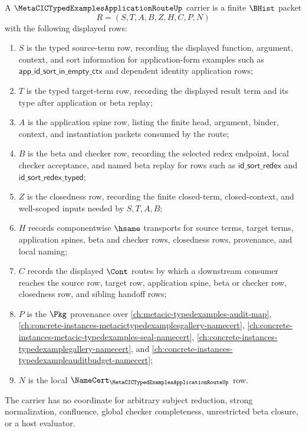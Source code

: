 \begin{definition}
\label{def:metacic-typedexamples-application-route-carrier}
A $\MetaCICTypedExamplesApplicationRouteUp$ carrier is a finite $\BHist$ packet
$$
R=(S,T,A,B,Z,H,C,P,N)
$$
with the following displayed rows:
\begin{enumerate}
\item $S$ is the typed source-term row, recording the displayed function, argument, context, and sort information for application-form examples such as $\mathsf{app\_id\_sort\_in\_empty\_ctx}$ and dependent identity application rows;
\item $T$ is the typed target-term row, recording the displayed result term and its type after application or beta replay;
\item $A$ is the application spine row, listing the finite head, argument, binder, context, and instantiation packets consumed by the route;
\item $B$ is the beta and checker row, recording the selected redex endpoint, local checker acceptance, and named beta replay for rows such as $\mathsf{id\_sort\_redex}$ and $\mathsf{id\_sort\_redex\_typed}$;
\item $Z$ is the closedness row, recording the finite closed-term, closed-context, and well-scoped inputs needed by $S,T,A,B$;
\item $H$ records componentwise $\hsame$ transports for source terms, target terms, application spines, beta and checker rows, closedness rows, provenance, and local naming;
\item $C$ records the displayed $\Cont$ routes by which a downstream consumer reaches the source row, target row, application spine, beta or checker row, closedness row, and sibling handoff rows;
\item $P$ is the $\Pkg$ provenance over \autoref{ch:metacic-typedexamples-audit-map}, \autoref{ch:concrete-instances-metacictypedexamplesgallery-namecert}, \autoref{ch:concrete-instances-metacic-typedexamples-seal-namecert}, \autoref{ch:concrete-instances-typedexamplegallery-namecert}, and \autoref{ch:concrete-instances-typedexampleauditbudget-namecert};
\item $N$ is the local $\NameCert_{\MetaCICTypedExamplesApplicationRouteUp}$ row.
\end{enumerate}
The carrier has no coordinate for arbitrary subject reduction, strong normalization, confluence, global checker completeness, unrestricted beta closure, or a host evaluator.
\end{definition}

